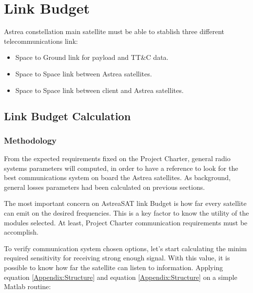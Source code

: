 \section{Link Budget}
Astrea constellation main satellite must be able to stablish three different telecommunications link: 
\begin{itemize}
\item Space to Ground link for payload and TT\&C data.
\item Space to Space link between Astrea satellites.
\item Space to Space link between client and Astrea satellites.
\end{itemize} 

\subsection{Link Budget Calculation}

\subsubsection{Methodology}
From the expected requirements fixed on the Project Charter, general radio systems parameters will computed, in order to have a reference to look for the best communications system on board the Astrea satellites. As background, general losses parameters had been calculated on previous sections. 

The most important concern on AstreaSAT link Budget is how far every satellite can emit on the desired frequencies. This is a key factor to know the utility of the modules selected. At least, Project Charter communication requirements must be accomplish.
 
To verify communication system chosen options, let's start calculating the minim required sensitivity for receiving strong enough signal. With this value, it is possible to know how far the satellite can listen to information.
Applying equation \ref{Appendix:Structure} and equation \ref{Appendix:Structure} on a simple Matlab routine:

